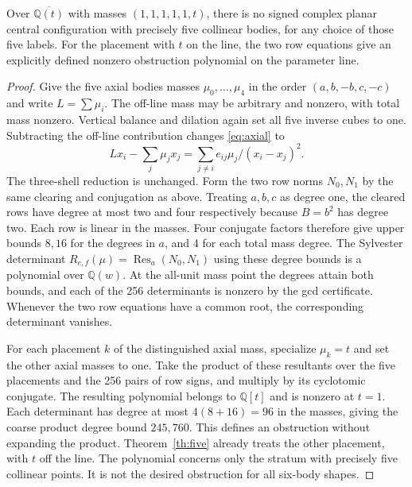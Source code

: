 \documentclass[11pt]{article}
\begin{document}
\begin{corollary}\label{cor:anyfive}
Over $\overline{\mathbb Q(t)}$ with masses $(1,1,1,1,1,t)$, there is no signed complex planar central configuration with precisely five collinear bodies, for any choice of those five labels. For the placement with $t$ on the line, the two row equations give an explicitly defined nonzero obstruction polynomial on the parameter line.
\end{corollary}
\begin{proof}
Give the five axial bodies masses $\mu_0,\ldots,\mu_4$ in the order $(a,b,-b,c,-c)$ and write $L=\sum\mu_i$. The off-line mass may be arbitrary and nonzero, with total mass nonzero. Vertical balance and dilation again set all five inverse cubes to one. Subtracting the off-line contribution changes \eqref{eq:axial} to
\[
  Lx_i-\sum_j \mu_jx_j=\sum_{j\ne i}e_{ij}\mu_j/(x_i-x_j)^2.
\]
The three-shell reduction is unchanged. Form the two row norms $N_0,N_1$ by the same clearing and conjugation as above. Treating $a,b,c$ as degree one, the cleared rows have degree at most two and four respectively because $B=b^2$ has degree two. Each row is linear in the masses. Four conjugate factors therefore give upper bounds $8,16$ for the degrees in $a$, and $4$ for each total mass degree. The Sylvester determinant $R_{e,f}(\mu)=\operatorname{Res}_{a}(N_0,N_1)$ using these degree bounds is a polynomial over $\mathbb Q(w)$. At the all-unit mass point the degrees attain both bounds, and each of the 256 determinants is nonzero by the gcd certificate. Whenever the two row equations have a common root, the corresponding determinant vanishes.

For each placement $k$ of the distinguished axial mass, specialize $\mu_k=t$ and set the other axial masses to one. Take the product of these resultants over the five placements and the 256 pairs of row signs, and multiply by its cyclotomic conjugate. The resulting polynomial belongs to $\mathbb Q[t]$ and is nonzero at $t=1$. Each determinant has degree at most $4(8+16)=96$ in the masses, giving the coarse product degree bound $245{,}760$. This defines an obstruction without expanding the product. Theorem~\ref{th:five} already treats the other placement, with $t$ off the line. The polynomial concerns only the stratum with precisely five collinear points. It is not the desired obstruction for all six-body shapes.
\end{proof}
\end{document}
